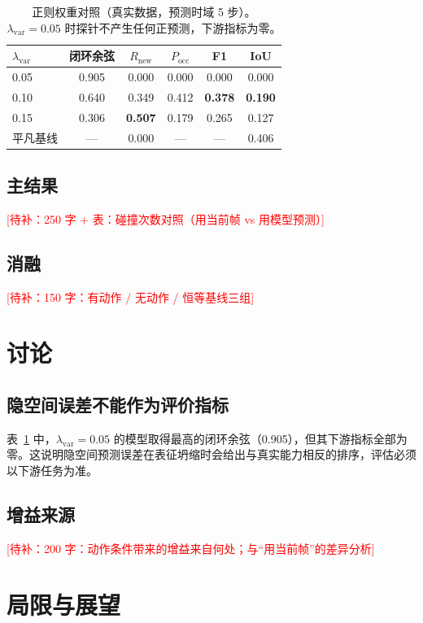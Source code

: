 \documentclass[12pt,a4paper]{ctexart}
\newcommand{\todo}[1]{\textcolor{red}{[待补：#1]}}
\begin{document}
\begin{table}[H]
\centering
\caption{正则权重对照（真实数据，预测时域 5 步）。$\lambda_{\text{var}}=0.05$ 时探针不产生任何正预测，下游指标为零。}
\label{tab:lambda}
\begin{tabular}{lccccc}
\toprule
$\lambda_{\text{var}}$ & 闭环余弦 & $R_{\text{new}}$ & $P_{\text{occ}}$ & F1 & IoU \\
\midrule
0.05 & 0.905 & 0.000 & 0.000 & 0.000 & 0.000 \\
0.10 & 0.640 & 0.349 & 0.412 & \textbf{0.378} & \textbf{0.190} \\
0.15 & 0.306 & \textbf{0.507} & 0.179 & 0.265 & 0.127 \\
\midrule
平凡基线 & ---          & 0.000 & ---          & ---          & 0.406 \\
\bottomrule
\end{tabular}
\end{table}

\subsection{主结果}
\todo{250 字 + 表：碰撞次数对照（用当前帧 vs 用模型预测）}

\subsection{消融}
\todo{150 字：有动作 / 无动作 / 恒等基线三组}

\section{讨论}

\subsection{隐空间误差不能作为评价指标}
表~\ref{tab:lambda} 中，$\lambda_{\text{var}}=0.05$ 的模型取得最高的闭环余弦（0.905），但其下游指标全部为零。这说明隐空间预测误差在表征坍缩时会给出与真实能力相反的排序，评估必须以下游任务为准。

\subsection{增益来源}
\todo{200 字：动作条件带来的增益来自何处；与``用当前帧''的差异分析}

\section{局限与展望}
\end{document}
